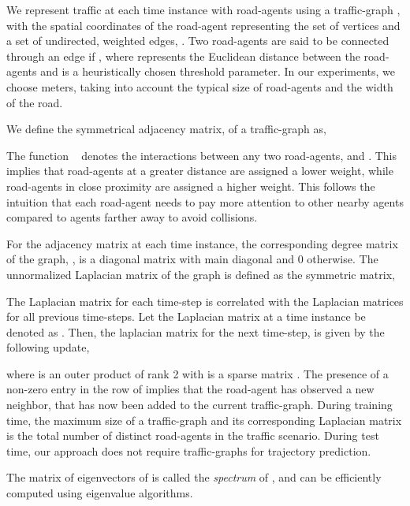 \documentclass[10pt,twocolumn,letterpaper]{article}
\theoremstyle{plain}
\begin{document}
We represent traffic at each time instance with  road-agents using a traffic-graph , with the spatial coordinates of the road-agent representing the set of vertices  and a set of undirected, weighted edges, . Two road-agents are said to be connected through an edge if , where  represents the Euclidean distance between the road-agents and  is a heuristically chosen threshold parameter. In our experiments, we choose  meters, taking into account the typical size of road-agents and the width of the road. 

We define the symmetrical adjacency matrix,  of a traffic-graph  as,



\noindent The function ~\cite{belkin2003laplacian} denotes the interactions between any two road-agents,  and . This implies that road-agents at a greater distance are assigned a lower weight, while road-agents in close proximity are assigned a higher weight. This follows the intuition that each road-agent needs to pay more attention to other nearby agents compared to agents farther away to avoid collisions.



For the adjacency matrix  at each time instance, the corresponding degree matrix  of the graph, , is a diagonal matrix with main diagonal  and 0 otherwise. The unnormalized Laplacian matrix  of the graph is defined as the symmetric matrix,



The Laplacian matrix for each time-step is correlated with the Laplacian matrices for all previous time-steps. Let the Laplacian matrix at a time instance  be denoted as . Then, the laplacian matrix for the next time-step,  is given by the following update,



\noindent where  is an outer product of rank 2 with  is a sparse matrix . The presence of a non-zero entry in the  row of  implies that the  road-agent has observed a new neighbor, that has now been added to the current traffic-graph. During training time, the maximum size of a traffic-graph and its corresponding Laplacian matrix is the total number of distinct road-agents in the traffic scenario. During test time, our approach does not require traffic-graphs for trajectory prediction.

The matrix  of eigenvectors of  is called the \emph{spectrum} of , and can be efficiently computed using eigenvalue algorithms.
\end{document}
